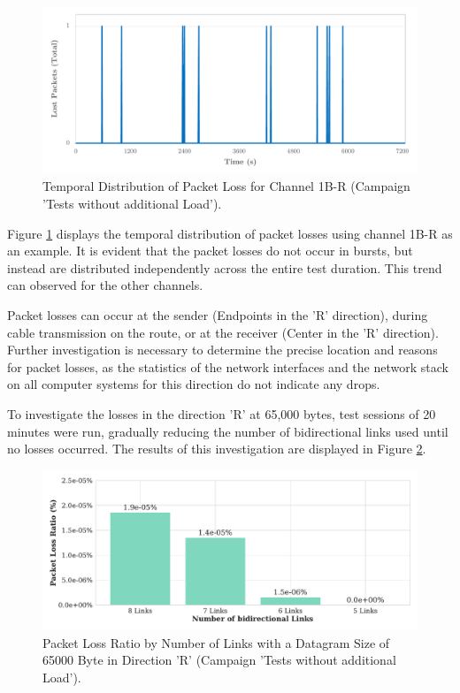 \begin{figure}[h!]
    \centering
    \includegraphics[width=1\linewidth]{figures/reliability/ihawk/diagr4.pdf}
    \caption{Temporal Distribution of Packet Loss for Channel 1B-R (Campaign 'Tests without additional Load').}
    \label{fig:diagr4Temp}
\end{figure}

Figure \ref{fig:diagr4Temp} displays the temporal distribution of packet losses using channel 1B-R as an example. It is evident that the packet losses do not occur in bursts, but instead are distributed independently across the entire test duration. This trend can observed for the other channels.

Packet losses can occur at the sender (Endpoints in the 'R' direction), during cable transmission on the route, or at the receiver (Center in the 'R' direction). Further investigation is necessary to determine the precise location and reasons for packet losses, as the statistics of the network interfaces and the network stack on all computer systems for this direction do not indicate any drops.

To investigate the losses in the direction 'R' at 65,000 bytes, test sessions of 20 minutes were run, gradually reducing the number of bidirectional links used until no losses occurred. The results of this investigation are displayed in Figure \ref{fig:diagr5Loss}.

\begin{figure}[h!]
    \centering
    \includegraphics[width=1\linewidth]{figures/reliability/ihawk/diagr5.pdf}
    \caption{Packet Loss Ratio by Number of Links with a Datagram Size of 65000 Byte in Direction 'R' (Campaign 'Tests without additional Load').}
    \label{fig:diagr5Loss}
\end{figure}

